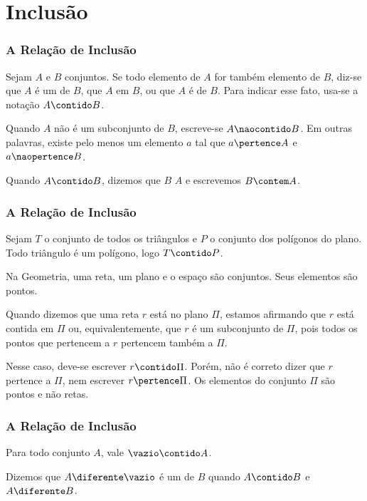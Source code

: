\section{Inclusão}


\begin{frame}
	\frametitle{A Relação de Inclusão}

	\begin{definicao}
		Sejam $A$ e $B$ conjuntos. Se todo elemento de $A$ for também elemento de $B$, diz-se que $A$ é um  de $B$, que $A$  em $B$, ou que $A$ é  de $B$. Para indicar esse fato, usa-se a notação $A \contido B$.
	\end{definicao}

	Quando $A$ não é um subconjunto de $B$, escreve-se $A \naocontido B$. Em outras palavras, existe pelo menos um elemento $a$ tal que $a \pertence A$ e $a \naopertence B$.

	Quando $A \contido B$, dizemos que $B$  $A$ e escrevemos $B \contem A$.
\end{frame}


\begin{frame}
	\frametitle{A Relação de Inclusão} 

	\begin{exemplo}
		Sejam $T$ o conjunto de todos os triângulos e $P$ o conjunto dos polígonos do plano. Todo triângulo é um polígono, logo $ T \contido P$.
	\end{exemplo}

	\begin{exemplo}
		Na Geometria, uma reta, um plano e o espaço são conjuntos. Seus elementos são pontos.

		Quando dizemos que uma reta $r$ está no plano $\Pi$, estamos afirmando que $r$ está contida em $\Pi$ ou, equivalentemente, que $r$ é um subconjunto de $\Pi$, pois todos os pontos que pertencem a $r$ pertencem também a $\Pi$.

		Nesse caso, deve-se escrever $ r \contido \Pi$. Porém, não é correto dizer que $r$ pertence a $\Pi$, nem escrever $r \pertence \Pi$. Os elementos do conjunto $\Pi$ são pontos e não retas.
	\end{exemplo}
\end{frame}


\begin{frame}
	\frametitle{A Relação de Inclusão} 

	\begin{proposicao}
		Para todo conjunto $A$, vale $\vazio \contido A$.
	\end{proposicao}

	\begin{definicao}
		Dizemos que $A \diferente \vazio$ é um  de $B$ quando $A \contido B$  e $A \diferente B$.
	\end{definicao}
\end{frame}


